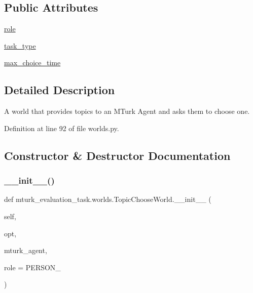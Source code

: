 \subsection*{Public Attributes}
\begin{DoxyCompactItemize}
\item 
\hyperlink{classmturk__evaluation__task_1_1worlds_1_1TopicChooseWorld_ae4b2f15304f19e802dad4191efb79184}{role}
\item 
\hyperlink{classmturk__evaluation__task_1_1worlds_1_1TopicChooseWorld_abb9412f28859e47ab87dd4790644804a}{task\+\_\+type}
\item 
\hyperlink{classmturk__evaluation__task_1_1worlds_1_1TopicChooseWorld_af2e375087b834f39d8c0ec2c854ba7b3}{max\+\_\+choice\+\_\+time}
\end{DoxyCompactItemize}


\subsection{Detailed Description}
\begin{DoxyVerb}A world that provides topics to an MTurk Agent and asks them to choose
one.
\end{DoxyVerb}
 

Definition at line 92 of file worlds.\+py.



\subsection{Constructor \& Destructor Documentation}
\mbox{\label{classmturk__evaluation__task_1_1worlds_1_1TopicChooseWorld_a9e06ee83119626b530d5408b9f232457}} 
\subsubsection{\texorpdfstring{\+\_\+\+\_\+init\+\_\+\+\_\+()}{\_\_init\_\_()}}
{\footnotesize\ttfamily def mturk\+\_\+evaluation\+\_\+task.\+worlds.\+Topic\+Choose\+World.\+\_\+\+\_\+init\+\_\+\+\_\+ (\begin{DoxyParamCaption}\item[{}]{self,  }\item[{}]{opt,  }\item[{}]{mturk\+\_\+agent,  }\item[{}]{role = {\ttfamily \textquotesingle{}PERSON\+\_\textquotesingle{}} }\end{DoxyParamCaption})}



